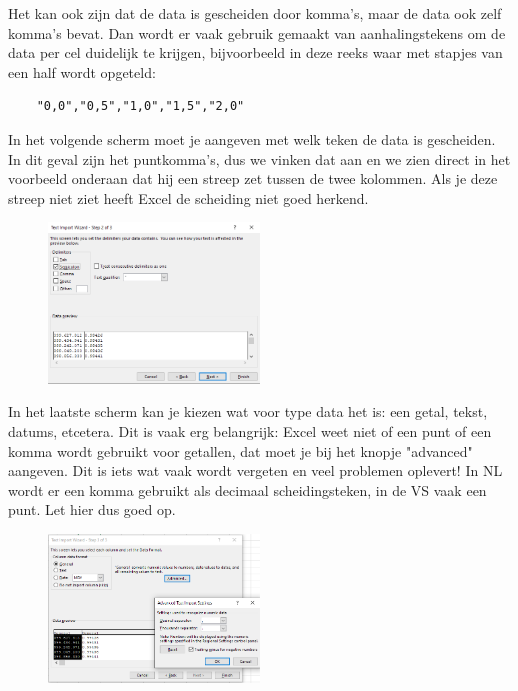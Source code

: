 Het kan ook zijn dat de data is gescheiden door komma's, maar de data ook zelf komma's bevat. Dan wordt er vaak gebruik gemaakt van aanhalingstekens om de data per cel duidelijk te krijgen, bijvoorbeeld in deze reeks waar met stapjes van een half wordt opgeteld:
\begin{verbatim}
    "0,0","0,5","1,0","1,5","2,0"
\end{verbatim}

In het volgende scherm moet je aangeven met welk teken de data is gescheiden. In dit geval zijn het puntkomma's, dus we vinken dat aan en we zien direct in het voorbeeld onderaan dat hij een streep zet tussen de twee kolommen. Als je deze streep niet ziet heeft Excel de scheiding niet goed herkend.

\begin{figure}[h]
\begin{center}
\includegraphics[width=0.5\textwidth]{img/Excelimport3.png}
\end{center}
\end{figure}

In het laatste scherm kan je kiezen wat voor type data het is: een getal, tekst, datums, etcetera. Dit is vaak erg belangrijk: Excel weet niet of een punt of een komma wordt gebruikt voor getallen, dat moet je bij het knopje "advanced" aangeven. Dit is iets wat vaak wordt vergeten en veel problemen oplevert! In NL wordt er een komma gebruikt als decimaal scheidingsteken, in de VS vaak een punt. Let hier dus goed op.

\begin{figure}[h]
\begin{center}
\includegraphics[width=0.5\textwidth]{img/Excelimport4.png}
\end{center}
\end{figure}

